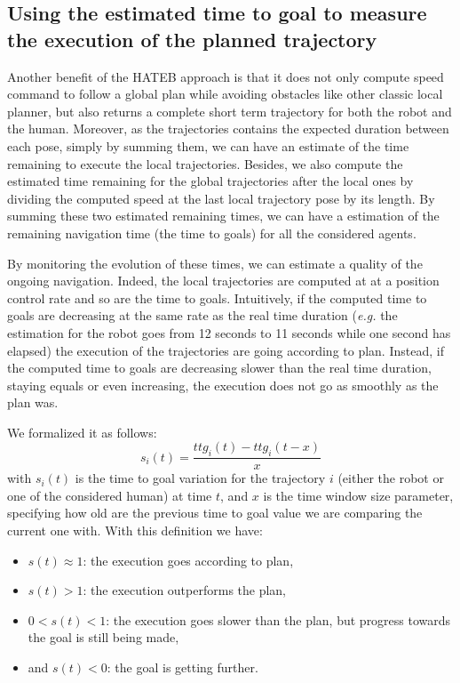 \documentclass[a4paper,11pt,twoside]{StyleThese}
\begin{document}

\subsection{Using the estimated time to goal to measure the execution of the planned trajectory}

Another benefit of the HATEB approach is that it does not only compute speed command to follow a global plan while avoiding obstacles like other classic local planner, but also returns a complete short term trajectory for both the robot and the human. Moreover, as the trajectories contains the expected duration between each pose, simply by summing them, we can have an estimate of the time remaining to execute the local trajectories. Besides, we also compute the estimated time remaining for the global trajectories after the local ones by dividing the computed speed at the last local trajectory pose by its length. By summing these two estimated remaining times, we can have a estimation of the remaining navigation time (the time to goals) for all the considered agents.

By monitoring the evolution of these times, we can estimate a quality of the ongoing navigation. Indeed, the local trajectories are computed at at a position control rate and so are the time to goals. Intuitively, if the computed time to goals are decreasing at the same rate as the real time duration (\textit{e.g.} the estimation for the robot goes from 12 seconds to 11 seconds while one second has elapsed) the execution of the trajectories are going according to plan. Instead, if the computed time to goals are decreasing slower than the real time duration, staying equals or even increasing, the execution does not go as smoothly as the plan was.

We formalized it as follows: 
\begin{equation}
s_i(t) = \frac{ttg_i(t) - ttg_i(t - x)}{x}
\end{equation}
with $s_i(t)$ is the time to goal variation for the trajectory $i$ (either the robot or one of the considered human) at time $t$, and $x$ is the time window size parameter, specifying how old are the previous time to goal value we are comparing the current one with.
With this definition we have:
\begin{itemize}
\item $s(t) \approx 1$: the execution goes according to plan,
\item $s(t) > 1$: the execution outperforms the plan,
\item $0 < s(t) < 1$: the execution goes slower than the plan, but progress towards the goal is still being made,
\item and $s(t) < 0$: the goal is getting further.
\end{itemize}
\end{document}
